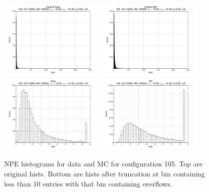  \begin{figure}[htbp] \begin{center} 
\includegraphics[width=0.45\textwidth]{../FIGURES/105/FIG_Original_Data.pdf} 
\includegraphics[width=0.45\textwidth]{../FIGURES/105/FIG_Original_MC.pdf} 
\includegraphics[width=0.45\textwidth]{../FIGURES/105/FIG_Data.pdf} 
\includegraphics[width=0.45\textwidth]{../FIGURES/105/FIG_MC.pdf} 
\caption{NPE histograms for data and MC for configuration 105. Top are original hists. Bottom are hists after truncation at bin containing less than 10 entries with that bin containing overflows.} 
\label{tab:npe_105} 
\end{center} \end{figure} 

